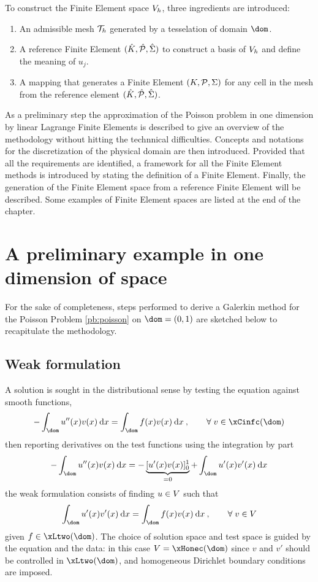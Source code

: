 \medskip
To construct the Finite Element space ${{V}}_h$, three ingredients are introduced:
\begin{enumerate}
\item An admissible mesh ${\mathcal T}_h$ generated by a tesselation of domain $\dom$.
\item A reference Finite Element ${({\hat {{K}}},{\hat {{\mathcal P}}}, {\hat{{\Sigma}}})}$ to construct a basis of ${{V}}_h$ and define the meaning of $u_j$.
\item A mapping that generates a Finite Element ${({K},{\mathcal P}, {\Sigma})}$ for any cell in the mesh from the reference element ${({\hat {{K}}},{\hat {{\mathcal P}}}, {\hat{{\Sigma}}})}$.
\end{enumerate}

\medskip
As a preliminary step the approximation of the Poisson problem in one dimension by linear Lagrange Finite Elements is described to give an overview of the methodology without hitting the technnical difficulties.
Concepts and notations for the discretization of the physical domain are then introduced.
Provided that all the requirements are identified, a framework for all the Finite Element methods is introduced by stating the definition of a Finite Element.
Finally, the generation of the Finite Element space from a reference Finite Element will be described.
Some examples of Finite Element spaces are listed at the end of the chapter.

\section{A preliminary example in one dimension of space}\label{sec:poisson_lagrange_p1}

For the sake of completeness, steps performed to derive a Galerkin method for the Poisson Problem \ref{pb:poisson} on $\dom = (0, 1)$ are sketched below to recapitulate the methodology.

\subsection{Weak formulation}

A solution is sought in the distributional sense by testing the equation against smooth functions,
\begin{equation*}
- \int_\dom u''(x) v(x) \md x = \int_\dom f(x) v(x) \md x\:,\qquad\forany v \in \xCinfc(\dom)
\end{equation*}
then reporting derivatives on the test functions using the integration by part
\begin{equation*}
- \int_\dom u''(x) v(x) \md x = - \underbrace{[u'(x)v(x)]_0^1}_{= 0} + \int_\dom u'(x) v'(x) \md x
\end{equation*}
the weak formulation consists of finding $u\in{V}$ such that
\begin{equation*}
\int_\dom u'(x) v'(x) \md x = \int_\dom f(x) v(x) \md x\:,\qquad\forany v \in \xV
\end{equation*}
given $f \in \xLtwo(\dom)$.
The choice of solution space and test space is guided by the equation and the data: in this case $\xV = \xHonec(\dom)$ since $v$ and $v'$ should be controlled in $\xLtwo(\dom)$, and homogeneous Dirichlet boundary conditions are imposed.

